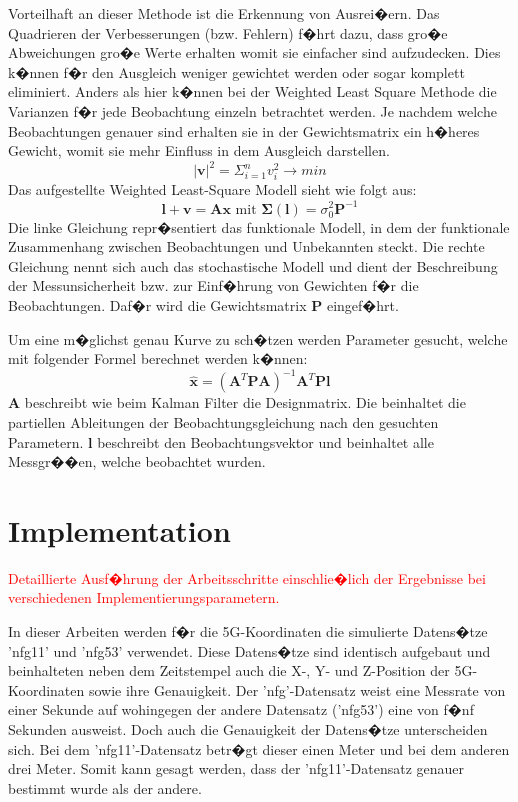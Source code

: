 Vorteilhaft an dieser Methode ist die Erkennung von Ausrei�ern. Das Quadrieren der Verbesserungen (bzw. Fehlern) f�hrt dazu, dass gro�e Abweichungen gro�e Werte erhalten womit sie einfacher sind aufzudecken. Dies k�nnen f�r den Ausgleich weniger gewichtet werden oder sogar komplett eliminiert. Anders als hier k�nnen bei der Weighted Least Square Methode die Varianzen f�r jede Beobachtung einzeln betrachtet werden. Je nachdem welche Beobachtungen genauer sind erhalten sie in der Gewichtsmatrix ein h�heres Gewicht, womit sie mehr Einfluss in dem Ausgleich darstellen. 
\begin{equation}\label{v}
 \left| \boldsymbol{v} \right|^2 = \Sigma_{i=1}^{n}v_i^2 	\rightarrow min 
\end{equation}
Das aufgestellte Weighted Least-Square Modell sieht wie folgt aus:
\begin{equation}
\boldsymbol{l}+\boldsymbol{v} = \boldsymbol{A}\boldsymbol{x} \textrm{ mit } \boldsymbol{\Sigma(l)} = \sigma_0^2\boldsymbol{P}^{-1}
\end{equation}
Die linke Gleichung repr�sentiert das funktionale Modell, in dem der funktionale Zusammenhang zwischen Beobachtungen und Unbekannten steckt. Die rechte Gleichung nennt sich auch das stochastische Modell und dient der Beschreibung der Messunsicherheit bzw. zur Einf�hrung von Gewichten f�r die Beobachtungen. Daf�r wird die Gewichtsmatrix $\boldsymbol{P}$ eingef�hrt.

Um eine m�glichst genau Kurve zu sch�tzen werden Parameter gesucht, welche mit folgender Formel berechnet werden k�nnen: 
\begin{equation}\label{LS}
	\hat{\boldsymbol{x}} = \left(\boldsymbol{A}^T\boldsymbol{P}\boldsymbol{A}\right)^{-1}\boldsymbol{A}^T\boldsymbol{P}\boldsymbol{l}
\end{equation}
$\boldsymbol{A}$ beschreibt wie beim Kalman Filter die Designmatrix. Die beinhaltet die partiellen Ableitungen der Beobachtungsgleichung nach den gesuchten Parametern. $\boldsymbol{l}$ beschreibt den Beobachtungsvektor und beinhaltet alle Messgr��en, welche beobachtet wurden. 

\section{Implementation}
\textcolor{red}{Detaillierte Ausf�hrung der Arbeitsschritte einschlie�lich der Ergebnisse bei verschiedenen Implementierungsparametern.}

In dieser Arbeiten werden f�r die  5G-Koordinaten die simulierte Datens�tze 'nfg11' und 'nfg53' verwendet. Diese Datens�tze sind identisch aufgebaut und beinhalteten neben dem Zeitstempel auch die X-, Y- und Z-Position der 5G-Koordinaten sowie ihre Genauigkeit. Der 'nfg'-Datensatz weist eine Messrate von einer Sekunde auf wohingegen der andere Datensatz ('nfg53') eine von f�nf Sekunden ausweist. Doch auch die Genauigkeit der Datens�tze unterscheiden sich. Bei dem 'nfg11'-Datensatz betr�gt dieser einen Meter und bei dem anderen drei Meter. Somit kann gesagt werden, dass der 'nfg11'-Datensatz genauer bestimmt wurde als der andere.

